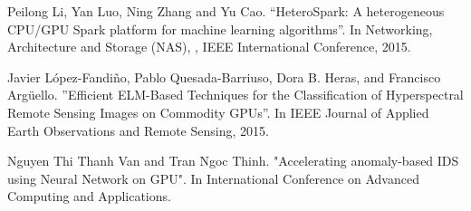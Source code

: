 \documentclass[margin, 10pt]{res} %
\begin{document}
\begin{resume}
Peilong Li, Yan Luo, Ning Zhang and Yu Cao. “HeteroSpark: A heterogeneous CPU/GPU Spark platform for machine learning algorithms”. In Networking, Architecture and Storage (NAS), , IEEE International Conference, 2015.

Javier López-Fandiño, Pablo Quesada-Barriuso, Dora B. Heras, and Francisco Argüello. ”Efficient ELM-Based Techniques for the Classification of Hyperspectral Remote Sensing Images on Commodity GPUs”. In IEEE Journal of Applied Earth Observations and Remote Sensing, 2015.

Nguyen Thi Thanh Van and Tran Ngoc Thinh. "Accelerating anomaly-based IDS using Neural Network on GPU". In International Conference on Advanced Computing and Applications. 

\end{resume}
\end{document}
